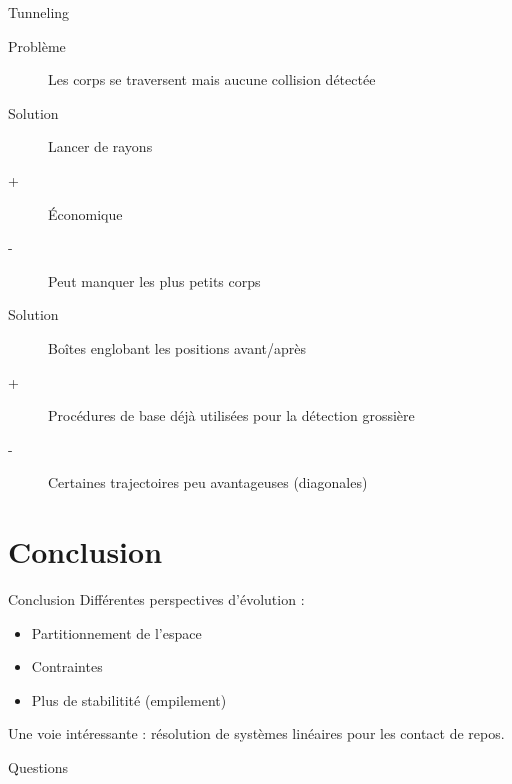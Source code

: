 \documentclass{beamer}
\begin{document}
\begin{frame}{Tunneling}
  \begin{description}
    \item[Problème]
      Les corps se traversent mais aucune collision détectée
  \end{description}

  \vfill

  \begin{overprint}

    \begin{figure}
      \centering
      
    \end{figure}

    \begin{figure}
      \centering
      
    \end{figure}
    \vfill
    \begin{description}
    \item[Solution] Lancer de rayons
    \item[+] \'Economique
    \item[-] Peut manquer les plus petits corps
    \end{description}

    \begin{figure}
      \centering
      
    \end{figure}
    \vfill
    \begin{description}
    \item[Solution] Boîtes englobant les positions avant/après
    \item[+] Procédures de base déjà utilisées pour la détection grossière
    \item[-] Certaines trajectoires peu avantageuses (diagonales)
    \end{description}

  \end{overprint}
\end{frame}

\section{Conclusion}

\begin{frame}{Conclusion}
  Différentes perspectives d'évolution :
  \begin{itemize}
    \item Partitionnement de l'espace
    \item Contraintes
    \item Plus de stabilitité (empilement)
  \end{itemize}

  \vfill

  Une voie intéressante : résolution de systèmes linéaires pour les contact de repos.
\end{frame}

\begin{frame}
  \begin{center}
    \Huge{Questions}
  \end{center}
\end{frame}
\end{document}
